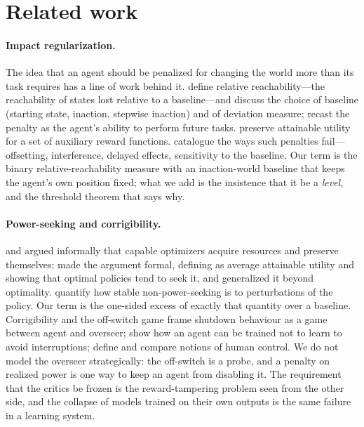 \section{Related work}
\label{sec:related}

\paragraph{Impact regularization.}
The idea that an agent should be penalized for changing the world more than its task requires has a line of work behind it.
\citet{krakovna2018rr} define relative reachability---the reachability of states lost relative to a baseline---and discuss the choice of baseline (starting state, inaction, stepwise inaction) and of deviation measure; \citet{krakovna2020future} recast the penalty as the agent's ability to perform future tasks.
\citet{turner2020aup} preserve attainable utility for a set of auxiliary reward functions.
\citet{lindner2021challenges} catalogue the ways such penalties fail---offsetting, interference, delayed effects, sensitivity to the baseline.
Our \Karma{} term is the binary relative-reachability measure with an inaction-world baseline that keeps the agent's own position fixed; what we add is the insistence that it be a \emph{level}, and the threshold theorem that says why.

\paragraph{Power-seeking and corrigibility.}
\citet{omohundro2008} and \citet{bostrom2014} argued informally that capable optimizers acquire resources and preserve themselves; \citet{turner2021power} made the argument formal, defining \POWER{} as average attainable utility and showing that optimal policies tend to seek it, and \citet{turner2022retargetable} generalized it beyond optimality.
\citet{gunter2024stability} quantify how stable non-power-seeking is to perturbations of the policy.
Our \Anatta{} term is the one-sided excess of exactly that quantity over a baseline.
Corrigibility \cite{soares2015corrigibility} and the off-switch game \cite{hadfieldmenell2017offswitch} frame shutdown behaviour as a game between agent and overseer; \citet{orseau2016interruptible} show how an agent can be trained not to learn to avoid interruptions; \citet{carey2023control} define and compare notions of human control.
We do not model the overseer strategically: the off-switch is a probe, and a penalty on realized power is one way to keep an agent from disabling it.
The requirement that the critics be frozen is the reward-tampering problem \cite{everitt2021tampering} seen from the other side, and the collapse of models trained on their own outputs \cite{shumailov2024collapse} is the same failure in a learning system.

